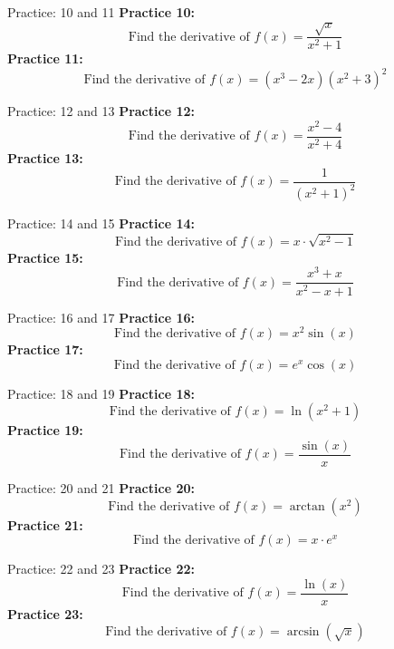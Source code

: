 \documentclass[aspectratio=169]{beamer}
\begin{document}
\begin{frame}{Practice: 10 and 11}
\textbf{Practice 10:}
\[
\text{Find the derivative of } f(x) = \frac{\sqrt{x}}{x^2 + 1}
\]
\vspace{1em}
\textbf{Practice 11:}
\[
\text{Find the derivative of } f(x) = (x^3 - 2x)(x^2 + 3)^2
\]
\end{frame}

\begin{frame}{Practice: 12 and 13}
\textbf{Practice 12:}
\[
\text{Find the derivative of } f(x) = \frac{x^2 - 4}{x^2 + 4}
\]
\vspace{1em}
\textbf{Practice 13:}
\[
\text{Find the derivative of } f(x) = \frac{1}{(x^2 + 1)^2}
\]
\end{frame}

\begin{frame}{Practice: 14 and 15}
\textbf{Practice 14:}
\[
\text{Find the derivative of } f(x) = x \cdot \sqrt{x^2 - 1}
\]
\vspace{1em}
\textbf{Practice 15:}
\[
\text{Find the derivative of } f(x) = \frac{x^3 + x}{x^2 - x + 1}
\]
\end{frame}

\begin{frame}{Practice: 16 and 17}
\textbf{Practice 16:}
\[
\text{Find the derivative of } f(x) = x^2 \sin(x)
\]
\vspace{1em}
\textbf{Practice 17:}
\[
\text{Find the derivative of } f(x) = e^x \cos(x)
\]
\end{frame}

\begin{frame}{Practice: 18 and 19}
\textbf{Practice 18:}
\[
\text{Find the derivative of } f(x) = \ln(x^2 + 1)
\]
\vspace{1em}
\textbf{Practice 19:}
\[
\text{Find the derivative of } f(x) = \frac{\sin(x)}{x}
\]
\end{frame}

\begin{frame}{Practice: 20 and 21}
\textbf{Practice 20:}
\[
\text{Find the derivative of } f(x) = \arctan(x^2)
\]
\vspace{1em}
\textbf{Practice 21:}
\[
\text{Find the derivative of } f(x) = x \cdot e^x
\]
\end{frame}

\begin{frame}{Practice: 22 and 23}
\textbf{Practice 22:}
\[
\text{Find the derivative of } f(x) = \frac{\ln(x)}{x}
\]
\vspace{1em}
\textbf{Practice 23:}
\[
\text{Find the derivative of } f(x) = \arcsin(\sqrt{x})
\]
\end{frame}
\end{document}
